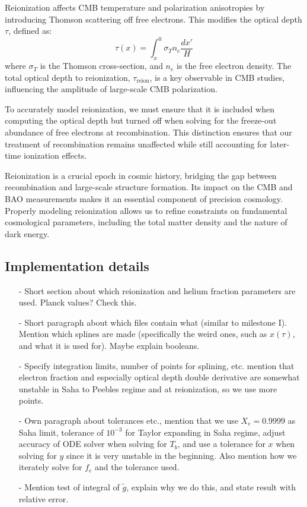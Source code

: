 \documentclass{aa}
\begin{document}
Reionization affects CMB temperature and polarization anisotropies by introducing Thomson scattering off free electrons. This modifies the optical depth $\tau$, defined as:
\begin{equation}
\tau(x) = \int_x^0 \sigma_T n_e \frac{dx'}{H}
\end{equation}
where $\sigma_T$ is the Thomson cross-section, and $n_e$ is the free electron density. The total optical depth to reionization, $\tau_\text{reion}$, is a key observable in CMB studies, influencing the amplitude of large-scale CMB polarization.

To accurately model reionization, we must ensure that it is included when computing the optical depth but turned off when solving for the freeze-out abundance of free electrons at recombination. This distinction ensures that our treatment of recombination remains unaffected while still accounting for later-time ionization effects.

Reionization is a crucial epoch in cosmic history, bridging the gap between recombination and large-scale structure formation. Its impact on the CMB and BAO measurements makes it an essential component of precision cosmology. Properly modeling reionization allows us to refine constraints on fundamental cosmological parameters, including the total matter density and the nature of dark energy.
\color{black}











\subsection{Implementation details}\label{subsec: II methods}
\begin{enumerate}
  \item [-] Short section about which reionization and helium fraction parameters are used. Planck values? Check this.
  \item [-] Short paragraph about which files contain what (similar to milestone I). Mention which splines are made (specifically the weird ones, such as $x(\tau)$, and what it is used for). Maybe explain booleans.
  \item [-] Specify integration limits, number of points for splining, etc. mention that electron fraction and especially optical depth double derivative are somewhat unstable in Saha to Peebles regime and at reionization, so we use more points.
  \item [-] Own paragraph about tolerances etc., mention that we use $X_e = 0.9999$ as Saha limit, tolerance of $10^{-3}$ for Taylor expanding in Saha regime, adjust accuracy of ODE solver when solving for $T_b$, and use a tolerance for $x$ when solving for $y$ since it is very unstable in the beginning. Also mention how we iterately solve for $f_e$ and the tolerance used.
  \item [-] Mention test of integral of $\tilde{g}$, explain why we do this, and state result with relative error.
\end{enumerate}
\end{document}
